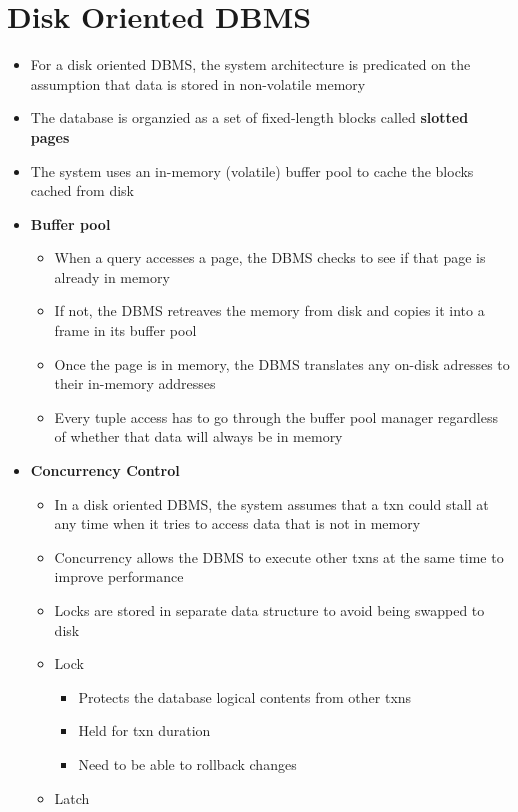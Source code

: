 \documentclass[11pt]{article}
\begin{document}
\section{Disk Oriented DBMS}
\begin{itemize}
    \item For a disk oriented DBMS, the system architecture is predicated on the assumption that data is stored in non-volatile memory
    \item The database is organzied as a set of fixed-length blocks called \textbf{slotted pages}
    \item The system uses an in-memory (volatile) buffer pool to cache the blocks cached from disk
    \item \textbf{Buffer pool}
    \begin{itemize}
        \item When a query accesses a page, the DBMS checks to see if that page is already in memory
        \item If not, the DBMS retreaves the memory from disk and copies it into a frame in its buffer pool
        \item Once the page is in memory, the DBMS translates any on-disk adresses to their in-memory addresses
        \item Every tuple access has to go through the buffer pool manager regardless of whether that data will always be in memory
    \end{itemize}
    \item \textbf{Concurrency Control}
    \begin{itemize}
        \item In a disk oriented DBMS, the system assumes that a txn could stall at any time when it tries to access data that is not in memory
        \item Concurrency allows the DBMS to execute other txns at the same time to improve performance
        \item Locks are stored in separate data structure to avoid being swapped to disk
        \item Lock~\cite{a16-graefe}
        \begin{itemize}
            \item Protects the database logical contents from other txns
            \item Held for txn duration
            \item Need to be able to rollback changes
        \end{itemize}
        \item Latch~\cite{a16-graefe}

\end{itemize}
\end{itemize}
\end{document}
